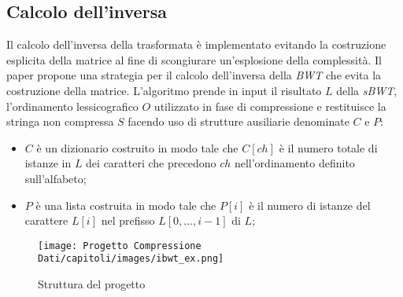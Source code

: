 \subsection{Calcolo dell'inversa}
Il calcolo dell'inversa della trasformata è implementato evitando la costruzione esplicita della matrice al fine di scongiurare un'esplosione della complessità. Il paper \cite{burrows1994block} propone una strategia per il calcolo dell'inversa della \emph{BWT} che evita la costruzione della matrice. L'algoritmo prende in input il risultato $L$ della \emph{sBWT}, l'ordinamento lessicografico $O$ utilizzato in fase di compressione e restituisce la stringa non compressa $S$ facendo uso di strutture ausiliarie denominate $C$ e $P$:
\begin{itemize}
    \item $C$ è un dizionario costruito in modo tale che $C[ch]$ è il numero totale di istanze in $L$ dei caratteri che precedono $ch$ nell'ordinamento definito sull'alfabeto;
    \item $P$ è una lista costruita in modo tale che $P[i]$ è il numero di istanze del carattere $L[i]$ nel prefisso $L[0,\dots,i-1]$ di $L$;
\end{itemize}
\begin{figure}[h]
    \centering
    \texttt{[image: Progetto Compressione Dati/capitoli/images/ibwt\_ex.png]}
\caption{Struttura del progetto}
    \label{fig:ibwt_ex}
\end{figure} \\
